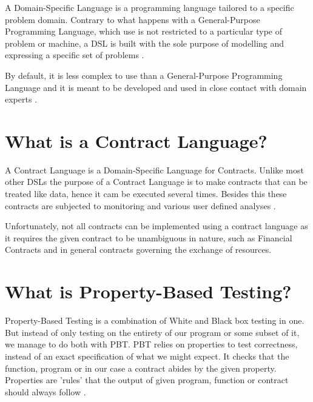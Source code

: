 \documentclass{ituthesis}
\begin{document}
A Domain-Specific Language is a programming language tailored to a specific problem domain. Contrary to what happens with a General-Purpose Programming Language, which use is not restricted to a particular type of problem or machine, a DSL is built with the sole purpose of modelling and expressing a specific set of problems \cite{van2000domain}.

By default, it is less complex to use than a General-Purpose Programming Language and it is meant to be developed and used in close contact with domain experts \cite{dsl}.

\section{What is a Contract Language?}
A Contract Language is a Domain-Specific Language for Contracts. Unlike most other DSLs the purpose of a Contract Language is to make contracts that can be treated like data, hence it cam be executed several times. Besides this these contracts are subjected to monitoring and various user defined analyses \cite{andersen2006compositional}.

Unfortunately, not all contracts can be implemented using a contract language as it requires the given contract to be unambiguous in nature, such as Financial Contracts and in general contracts governing the exchange of resources.


\section{What is Property-Based Testing?}
Property-Based Testing is a combination of White and Black box testing in one. But instead of only testing on the entirety of our program or some subset of it, we manage to do both with PBT. PBT relies on properties to test correctness, instead of an exact specification of what we might expect. It checks that the function, program or in our case a contract abides by the given property. Properties are 'rules' that the output of given program, function or contract should always follow \cite{fink1994towards}.
\end{document}
